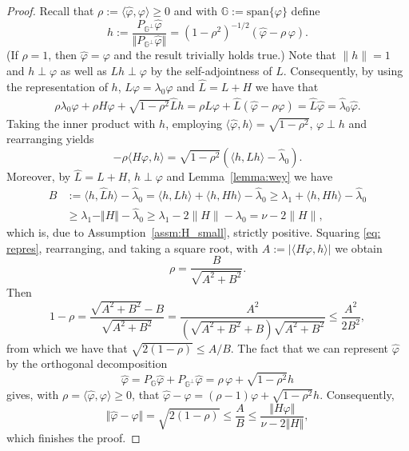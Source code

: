 \documentclass[10pt,a4paper]{amsart}
\newcommand{\lspan}{\mathrm{span}}
\begin{document}
\begin{proof}
Recall that $\rho := \langle \widehat \varphi, \varphi\rangle \ge 0$ and with $\mathbb{G}:=\lspan\{ \varphi\}$ define
	\begin{equation*}
	h := \frac{P_{\mathbb{G}^\perp} \widehat{\varphi}}{\Vert P_{\mathbb{G}^\perp} \widehat{\varphi} \Vert}
	= (1-\rho^2)^{-1/2} (\widehat \varphi - \rho\, \varphi).
	\end{equation*}
	(If $\rho=1$, then $\widehat \varphi = \varphi$ and the result trivially holds true.) Note that $\|h\|=1$
	and $h\perp \varphi$ as well as $L h \perp \varphi$ by the self-adjointness of $L$. 
 Consequently, by using the representation of $h$, $L\varphi = \lambda_0 \varphi$ and $\widehat L=L+H$ we have that
 \begin{align*}
  \rho \lambda_0 \varphi + \rho H \varphi + \sqrt{1-\rho^2} \widehat L h =
  \rho \widehat L \varphi + \widehat L (\widehat \varphi -\rho \varphi)
  = 
    \widehat L\widehat\varphi
= \widehat{\lambda}_0 \widehat\varphi.
 \end{align*}
Taking the inner product with $h$, employing $\langle \widehat \varphi,h \rangle = \sqrt{1-\rho^2}$, $\varphi\perp h$ and rearranging yields
\begin{equation}
\label{eq: repres}
    -\rho \langle H \varphi, h\rangle = \sqrt{1-\rho^2} \left( \langle h,\widehat L h\rangle -\widehat\lambda_0 \right).
\end{equation}
Moreover, by $\widehat{L}=L+H$, $h\perp \varphi$ and Lemma~\ref{lemma:wey} we have 
\begin{align*}
   B & := \langle h,\widehat{L} h \rangle - \widehat\lambda_0
    = \langle h,L h \rangle + \langle h,H h \rangle - \widehat\lambda_0 
    \geq \lambda_1 + \langle h,H h \rangle - \widehat\lambda_0  \\
    &\geq \lambda_1 - \Vert H \Vert - \widehat\lambda_0
    \geq \lambda_1 - 2\|H\|-\lambda_0=\nu-2\|H\|,
\end{align*}
which is, due to Assumption~\ref{assm:H_small}, strictly positive. 
Squaring \eqref{eq: repres}, rearranging, and taking a square root, with $A:=|\langle H \varphi ,h\rangle|$ we obtain
\begin{equation*}
    \rho = \frac{B}{\sqrt{A^2 + B^2}}.
\end{equation*}
Then
\begin{equation*}
    1-\rho = \frac{\sqrt{A^2+B^2}-B}{\sqrt{A^2+B^2}} = \frac{A^2}{(\sqrt{A^2+B^2}+B)\sqrt{A^2+B^2}}\le\frac{A^2}{2B^2},
\end{equation*}
from which we have that $\sqrt{2(1-\rho)}\le A/B$.
The fact that we can represent $\widehat \varphi$ by
	the orthogonal decomposition
	\begin{equation*}
	\widehat \varphi
	= P_{\mathbb{G}} \widehat \varphi +P_{\mathbb{G}^\perp} \widehat \varphi
	=
	\rho\, \varphi + \sqrt{1-\rho^2 } h
	\end{equation*}
 gives, with $\rho = \langle \widehat \varphi, \varphi\rangle \ge 0$, that
$
\widehat \varphi - \varphi = (\rho-1)\varphi + \sqrt{1-\rho^2} h.
$
Consequently, 
\[
\Vert \widehat\varphi -\varphi \Vert = \sqrt{2(1-\rho)} \leq \frac{A}{B} \leq \frac{\Vert H\varphi \Vert}{\nu - 2\Vert H \Vert},
\]
which finishes the proof.


\end{proof}
\end{document}
